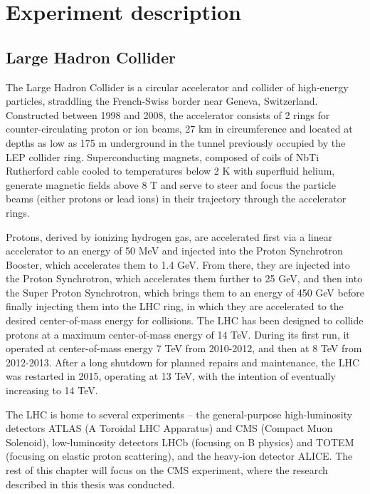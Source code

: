 \chapter{Experiment description\label{sec:experiment}}

\section{Large Hadron Collider\label{sec:lhc}}

The Large Hadron Collider is a circular accelerator and collider of high-energy particles, straddling the French-Swiss border near Geneva, Switzerland. Constructed between 1998 and 2008, the accelerator consists of 2 rings for counter-circulating proton or ion beams, 27 km in circumference and located at depths as low as 175 m underground in the tunnel previously occupied by the LEP collider ring. Superconducting magnets, composed of coils of NbTi Rutherford cable cooled to temperatures below 2 K with superfluid helium, generate magnetic fields above 8 T and serve to steer and focus the particle beams (either protons or lead ions) in their trajectory through the accelerator rings.

Protons, derived by ionizing hydrogen gas, are accelerated first via a linear accelerator to an energy of 50 MeV and injected into the Proton Synchrotron Booster, which accelerates them to 1.4 GeV. From there, they are injected into the Proton Synchrotron, which accelerates them further to 25 GeV, and then into the Super Proton Synchrotron, which brings them to an energy of 450 GeV before finally injecting them into the LHC ring, in which they are accelerated to the desired center-of-mass energy for collisions. The LHC has been designed to collide protons at a maximum center-of-mass energy of 14 TeV. During its first run, it operated at center-of-mass energy 7 TeV from 2010-2012, and then at 8 TeV from 2012-2013. After a long shutdown for planned repairs and maintenance, the LHC was restarted in 2015, operating at 13 TeV, with the intention of eventually increasing to 14 TeV.

The LHC is home to several experiments -- the general-purpose high-luminosity detectors ATLAS (A Toroidal LHC Apparatus) and CMS (Compact Muon Solenoid), low-luminosity detectors LHCb (focusing on B physics) and TOTEM (focusing on elastic proton scattering), and the heavy-ion detector ALICE. The rest of this chapter will focus on the CMS experiment, where the research described in this thesis was conducted.

